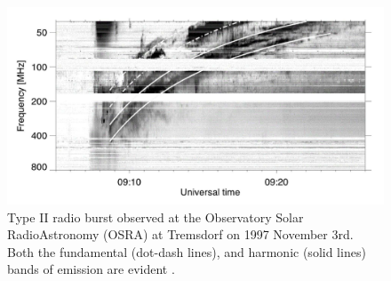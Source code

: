\begin{figure}
\begin{center}
\includegraphics[trim=2cm 1cm 2cm 3cm, scale=0.25]{images/typeII}
\caption[Type II radio burst]{Type II radio burst observed at the Observatory Solar RadioAstronomy (OSRA) at Tremsdorf on 1997 November 3rd. Both the fundamental (dot-dash lines), and harmonic (solid lines) bands of emission are evident \citep{khan2002}.}
\label{fig:typeII}
\end{center}
\end{figure}

